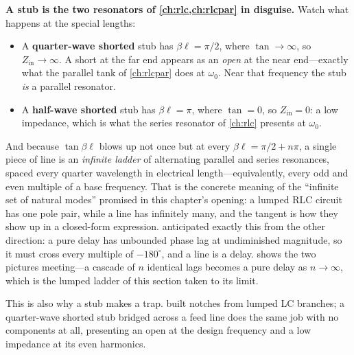 \begin{physicalbox}
\textbf{A stub is the two resonators of \cref{ch:rlc,ch:rlcpar} in disguise.}
Watch what happens at the special lengths:
\begin{itemize}
\item A \textbf{quarter-wave shorted} stub has \(\beta\ell=\pi/2\), where
\(\tan\to\infty\), so \(Z_{\mathrm{in}}\to\infty\). A short at the far end appears
as an \emph{open} at the near end---exactly what the parallel tank of
\cref{ch:rlcpar} does at \(\omega_0\). Near that frequency the stub \emph{is} a
parallel resonator.
\item A \textbf{half-wave shorted} stub has \(\beta\ell=\pi\), where \(\tan=0\), so
\(Z_{\mathrm{in}}=0\): a low impedance, which is what the series resonator of
\cref{ch:rlc} presents at \(\omega_0\).
\end{itemize}
And because \(\tan\beta\ell\) blows up not once but at every
\(\beta\ell=\pi/2+n\pi\), a single piece of line is an \emph{infinite ladder} of
alternating parallel and series resonances, spaced every quarter wavelength in
electrical length---equivalently, every odd and even multiple of a base frequency.
That is the concrete meaning of the ``infinite set of natural modes'' promised in
this chapter's opening: a lumped RLC circuit has one pole pair, while a line has
infinitely many, and the tangent is how they show up in a closed-form expression.
 anticipated exactly this from the other direction: a pure
delay has unbounded phase lag at undiminished magnitude, so it must cross every
multiple of \(-180^\circ\), and a line is a delay.  shows
the two pictures meeting---a cascade of \(n\) identical lags becomes a pure delay
as \(n\to\infty\), which is the lumped ladder of this section taken to its limit.

This is also why a stub makes a trap.  built notches from lumped
LC branches; a quarter-wave shorted stub bridged across a feed line does the same
job with no components at all, presenting an open at the design frequency and a low
impedance at its even harmonics.
\end{physicalbox}

